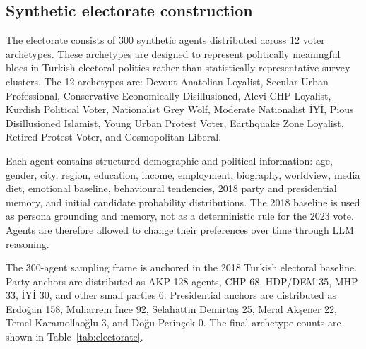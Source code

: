 \documentclass[pdflatex,sn-mathphys-num,iicol]{sn-jnl}
\begin{document}
\subsection{Synthetic electorate construction}\label{subsec:electorate}

The electorate consists of 300 synthetic agents distributed across 12 voter
archetypes. These archetypes are designed to represent politically meaningful
blocs in Turkish electoral politics rather than statistically representative
survey clusters. The 12 archetypes are: Devout Anatolian Loyalist, Secular
Urban Professional, Conservative Economically Disillusioned, Alevi-CHP
Loyalist, Kurdish Political Voter, Nationalist Grey Wolf, Moderate Nationalist
İYİ, Pious Disillusioned Islamist, Young Urban Protest Voter, Earthquake Zone
Loyalist, Retired Protest Voter, and Cosmopolitan Liberal.

Each agent contains structured demographic and political information: age,
gender, city, region, education, income, employment, biography, worldview,
media diet, emotional baseline, behavioural tendencies, 2018 party and
presidential memory, and initial candidate probability distributions. The 2018
baseline is used as persona grounding and memory, not as a deterministic rule
for the 2023 vote. Agents are therefore allowed to change their preferences over
time through LLM reasoning.

The 300-agent sampling frame is anchored in the 2018 Turkish electoral baseline.
Party anchors are distributed as AKP 128 agents, CHP 68, HDP/DEM 35, MHP 33,
İYİ 30, and other small parties 6. Presidential anchors are distributed as
Erdoğan 158, Muharrem İnce 92, Selahattin Demirtaş 25, Meral Akşener 22,
Temel Karamollaoğlu 3, and Doğu Perinçek 0. The final archetype counts are
shown in Table~\ref{tab:electorate}.
\end{document}
